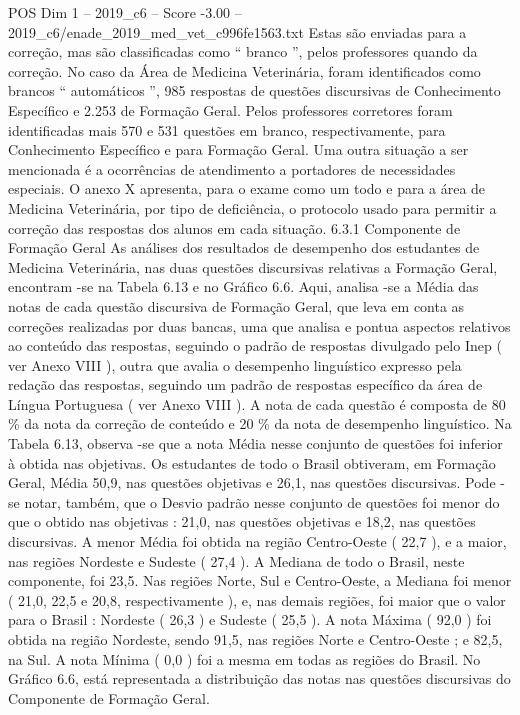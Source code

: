 \begin{textsample}{POS Dim 1 – 2019\_c6 – Score -3.00 – 2019\_c6/enade\_2019\_med\_vet\_c996fe1563.txt}
Estas são enviadas para a correção, mas são classificadas como “ branco ”, pelos professores quando da correção.
No caso da Área de Medicina Veterinária, foram identificados como brancos “ automáticos ”, 985 respostas de questões discursivas de Conhecimento Específico e 2.253 de Formação Geral.
Pelos professores corretores foram identificadas mais 570 e 531 questões em branco, respectivamente, para Conhecimento Específico e para Formação Geral.
Uma outra situação a ser mencionada é a ocorrências de atendimento a portadores de necessidades especiais.
O anexo X apresenta, para o exame como um todo e para a área de Medicina Veterinária, por tipo de deficiência, o protocolo usado para permitir a correção das respostas dos alunos em cada situação. 6.3.1 Componente de Formação Geral As análises dos resultados de desempenho dos estudantes de Medicina Veterinária, nas duas questões discursivas relativas a Formação Geral, encontram -se na Tabela 6.13 e no Gráfico 6.6.
Aqui, analisa -se a Média das notas de cada questão discursiva de Formação Geral, que leva em conta as correções realizadas por duas bancas, uma que analisa e pontua aspectos relativos ao conteúdo das respostas, seguindo o padrão de respostas divulgado pelo Inep ( ver Anexo VIII ), outra que avalia o desempenho linguístico expresso pela redação das respostas, seguindo um padrão de respostas específico da área de Língua Portuguesa ( ver Anexo VIII ).
A nota de cada questão é composta de 80 \% da nota da correção de conteúdo e 20 \% da nota de desempenho linguístico.
Na Tabela 6.13, observa -se que a nota Média nesse conjunto de questões foi inferior à obtida nas objetivas.
Os estudantes de todo o Brasil obtiveram, em Formação Geral, Média 50,9, nas questões objetivas e 26,1, nas questões discursivas.
Pode -se notar, também, que o Desvio padrão nesse conjunto de questões foi menor do que o obtido nas objetivas : 21,0, nas questões objetivas e 18,2, nas questões discursivas.
A menor Média foi obtida na região Centro-Oeste ( 22,7 ), e a maior, nas regiões Nordeste e Sudeste ( 27,4 ).
A Mediana de todo o Brasil, neste componente, foi 23,5.
Nas regiões Norte, Sul e Centro-Oeste, a Mediana foi menor ( 21,0, 22,5 e 20,8, respectivamente ), e, nas demais regiões, foi maior que o valor para o Brasil : Nordeste ( 26,3 ) e Sudeste ( 25,5 ).
A nota Máxima ( 92,0 ) foi obtida na região Nordeste, sendo 91,5, nas regiões Norte e Centro-Oeste ; e 82,5, na Sul.
A nota Mínima ( 0,0 ) foi a mesma em todas as regiões do Brasil.
No Gráfico 6.6, está representada a distribuição das notas nas questões discursivas do Componente de Formação Geral.

\end{textsample}
